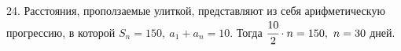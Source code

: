 24. Расстояния, проползаемые улиткой, представляют из себя арифметическую прогрессию, в которой $S_n=150,\ a_1+a_n=10.$ Тогда $\cfrac{10}{2}\cdot n=150,\ n=30$ дней.\\
